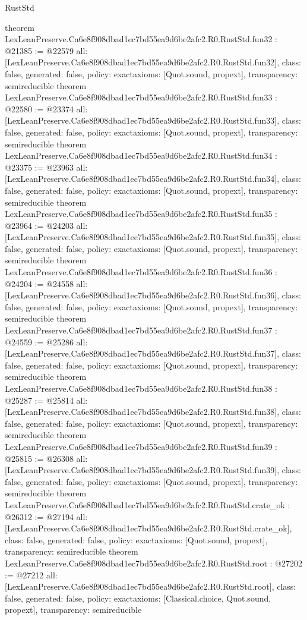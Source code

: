 \begin{lexlean}{RustStd}
\begin{coremodule}
{}
theorem LexLeanPreserve.Ca6e8f908dbad1ec7bd55ea9d6be2afc2.R0.RustStd.fun32 : @21385 := @22579 {
  all: [LexLeanPreserve.Ca6e8f908dbad1ec7bd55ea9d6be2afc2.R0.RustStd.fun32],
  class: false,
  generated: false,
  policy: exact{axioms: [Quot.sound, propext]},
  transparency: semireducible
}
theorem LexLeanPreserve.Ca6e8f908dbad1ec7bd55ea9d6be2afc2.R0.RustStd.fun33 : @22580 := @23374 {
  all: [LexLeanPreserve.Ca6e8f908dbad1ec7bd55ea9d6be2afc2.R0.RustStd.fun33],
  class: false,
  generated: false,
  policy: exact{axioms: [Quot.sound, propext]},
  transparency: semireducible
}
theorem LexLeanPreserve.Ca6e8f908dbad1ec7bd55ea9d6be2afc2.R0.RustStd.fun34 : @23375 := @23963 {
  all: [LexLeanPreserve.Ca6e8f908dbad1ec7bd55ea9d6be2afc2.R0.RustStd.fun34],
  class: false,
  generated: false,
  policy: exact{axioms: [Quot.sound, propext]},
  transparency: semireducible
}
theorem LexLeanPreserve.Ca6e8f908dbad1ec7bd55ea9d6be2afc2.R0.RustStd.fun35 : @23964 := @24203 {
  all: [LexLeanPreserve.Ca6e8f908dbad1ec7bd55ea9d6be2afc2.R0.RustStd.fun35],
  class: false,
  generated: false,
  policy: exact{axioms: [Quot.sound, propext]},
  transparency: semireducible
}
theorem LexLeanPreserve.Ca6e8f908dbad1ec7bd55ea9d6be2afc2.R0.RustStd.fun36 : @24204 := @24558 {
  all: [LexLeanPreserve.Ca6e8f908dbad1ec7bd55ea9d6be2afc2.R0.RustStd.fun36],
  class: false,
  generated: false,
  policy: exact{axioms: [Quot.sound, propext]},
  transparency: semireducible
}
theorem LexLeanPreserve.Ca6e8f908dbad1ec7bd55ea9d6be2afc2.R0.RustStd.fun37 : @24559 := @25286 {
  all: [LexLeanPreserve.Ca6e8f908dbad1ec7bd55ea9d6be2afc2.R0.RustStd.fun37],
  class: false,
  generated: false,
  policy: exact{axioms: [Quot.sound, propext]},
  transparency: semireducible
}
theorem LexLeanPreserve.Ca6e8f908dbad1ec7bd55ea9d6be2afc2.R0.RustStd.fun38 : @25287 := @25814 {
  all: [LexLeanPreserve.Ca6e8f908dbad1ec7bd55ea9d6be2afc2.R0.RustStd.fun38],
  class: false,
  generated: false,
  policy: exact{axioms: [Quot.sound, propext]},
  transparency: semireducible
}
theorem LexLeanPreserve.Ca6e8f908dbad1ec7bd55ea9d6be2afc2.R0.RustStd.fun39 : @25815 := @26308 {
  all: [LexLeanPreserve.Ca6e8f908dbad1ec7bd55ea9d6be2afc2.R0.RustStd.fun39],
  class: false,
  generated: false,
  policy: exact{axioms: [Quot.sound, propext]},
  transparency: semireducible
}
theorem LexLeanPreserve.Ca6e8f908dbad1ec7bd55ea9d6be2afc2.R0.RustStd.crate_ok : @26312 := @27194 {
  all: [LexLeanPreserve.Ca6e8f908dbad1ec7bd55ea9d6be2afc2.R0.RustStd.crate_ok],
  class: false,
  generated: false,
  policy: exact{axioms: [Quot.sound, propext]},
  transparency: semireducible
}
theorem LexLeanPreserve.Ca6e8f908dbad1ec7bd55ea9d6be2afc2.R0.RustStd.root : @27202 := @27212 {
  all: [LexLeanPreserve.Ca6e8f908dbad1ec7bd55ea9d6be2afc2.R0.RustStd.root],
  class: false,
  generated: false,
  policy: exact{axioms: [Classical.choice, Quot.sound, propext]},
  transparency: semireducible
}


\end{coremodule}
\end{lexlean}
